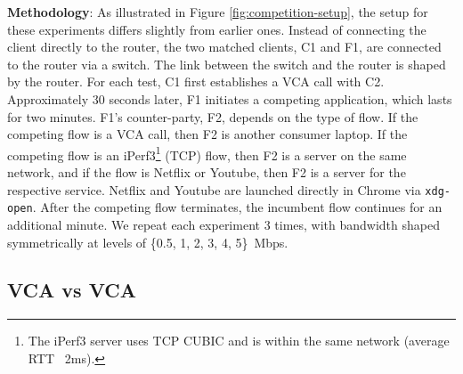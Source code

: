 \noindent \textbf{Methodology}: As illustrated in Figure \ref{fig:competition-setup}, the setup for these experiments differs slightly from earlier ones. 
Instead of connecting the client directly to the router, the two matched clients, C1 and F1, are connected to the router via a switch. 
The link between the switch and the router is shaped by the router. For each test, C1 first establishes a VCA call with C2.
Approximately 30 seconds later, F1 initiates a competing application, which lasts for two minutes.
F1's counter-party, F2, depends on the type of flow.
If the competing flow is a VCA call, then F2 is another consumer laptop.
If the competing flow is an iPerf3\footnote{The iPerf3 server uses TCP CUBIC and is  within the same network (average RTT ~2ms).} (TCP) flow, then F2 is a server on the same network,
  and if the flow is Netflix or Youtube, then F2 is a server for the respective service. Netflix and Youtube are launched directly in Chrome via \texttt{xdg-open}.
After the competing flow terminates, the incumbent flow continues for an additional minute.
We repeat each experiment 3 times, with bandwidth shaped symmetrically at levels of \{0.5, 1, 2, 3, 4, 5\}~Mbps.

\subsection{VCA vs VCA}


